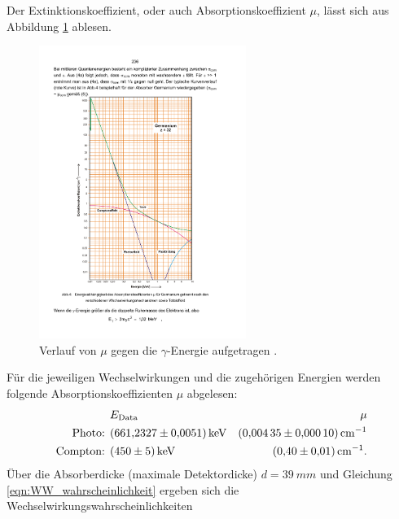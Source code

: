 Der Extinktionskoeffizient, oder auch Absorptionskoeffizient $\mu$, lässt sich aus Abbildung \ref{fig:absorptionskoeffizient} ablesen.
\begin{figure}[h!]
  \centering
  \includegraphics[width=0.6\textwidth]{content/images/V704.pdf}
  \caption{Verlauf von $\mu$ gegen die $\gamma$-Energie aufgetragen \cite{anleitungv704}.}
  \label{fig:absorptionskoeffizient}
\end{figure}
Für die jeweiligen Wechselwirkungen und die zugehörigen Energien werden folgende Absorptionskoeffizienten $\mu$ abgelesen:
\begin{align*}
                    & E_{\text{Data}}                          &  \mu \\
	\text{Photo: }	& \SI{661.2327 (51)}{\kilo \electronvolt}  &  \SI{0.00435 (10)}{cm^{-1}} \\
	\text{Compton: }	& \SI{450 (5)}{\kilo \electronvolt} 	    &  \SI{0.40 (1)}{cm^{-1}}. \\
\end{align*}
Über die Absorberdicke (maximale Detektordicke) $d=\SI{39}{mm}$ und Gleichung \eqref{eqn:WW_wahrscheinlichkeit} %
ergeben sich die Wechselwirkungswahrscheinlichkeiten

